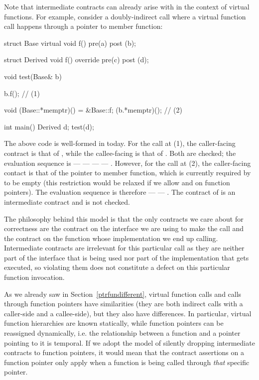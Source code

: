 Note that intermediate contracts can already arise with \cite{P2900R9} in the context of virtual functions. For example, consider a doubly-indirect call where a virtual function call happens through a pointer to member function:
\begin{codeblock}
struct Base {
  virtual void f() pre(a) post (b);
}

struct Derived {
  void f() override pre(c) post (d);
}

void test(Base& b) {
  b.f();  // (1)
  
  void (Base::*memptr)() = &Base::f;
  (b.*memptr)();  // (2)
}

int main() {
  Derived d;
  test(d);
}
\end{codeblock}
The above code is well-formed in \cite{P2900R9} today. For the call at (1), the caller-facing contract is that of , while the callee-facing is that of . Both are checked; the evaluation sequence is  ---  ---  ---  --- . However, for the call at (2), the caller-facing contact is that of the pointer to member function, which is currently required by \cite{P2900R9} to be empty (this restriction would be relaxed if we allow  and  on function pointers). The evaluation sequence is therefore  ---  --- . The contract of  is an intermediate contract and is not checked.

The philosophy behind this model is that the only contracts we care about for correctness are the contract on the interface we are using to make the call and the contract on the function whose implementation we end up calling. Intermediate contracts are irrelevant for this particular call as they are neither part of the  interface that is being used nor part of the implementation that gets executed, so violating them does not constitute a defect on this particular function invocation.

As we already saw in Section~\ref{ptrfundifferent}, virtual function calls and calls through function pointers have similarities (they are both indirect calls with a caller-side and a callee-side), but they also have differences. In particular, virtual function hierarchies are known statically, while function pointers can be reassigned dynamically, i.e. the relationship between a function and a pointer pointing to it is temporal. If we adopt the  \cite{P2900R9} model of silently dropping intermediate contracts to function pointers, it would mean that the contract assertions on a function pointer only apply when a function is being called through \emph{that} specific pointer.

